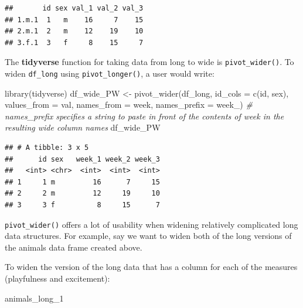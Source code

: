 \documentclass[
]{book}
\newenvironment{Shaded}{\begin{snugshade}}{\end{snugshade}}
\newcommand{\AttributeTok}[1]{\textcolor[rgb]{0.77,0.63,0.00}{#1}}
\newcommand{\CommentTok}[1]{\textcolor[rgb]{0.56,0.35,0.01}{\textit{#1}}}
\newcommand{\FunctionTok}[1]{\textcolor[rgb]{0.00,0.00,0.00}{#1}}
\newcommand{\NormalTok}[1]{#1}
\newcommand{\OtherTok}[1]{\textcolor[rgb]{0.56,0.35,0.01}{#1}}
\newcommand{\StringTok}[1]{\textcolor[rgb]{0.31,0.60,0.02}{#1}}
\begin{document}
\begin{verbatim}
##       id sex val_1 val_2 val_3
## 1.m.1  1   m    16     7    15
## 2.m.1  2   m    12    19    10
## 3.f.1  3   f     8    15     7
\end{verbatim}

The \textbf{tidyverse} function for taking data from long to wide is \texttt{pivot\_wider()}. To widen \texttt{df\_long} using \texttt{pivot\_longer()}, a user would write:

\begin{Shaded}
\begin{Highlighting}[]
\FunctionTok{library}\NormalTok{(tidyverse)}
\NormalTok{df\_wide\_PW }\OtherTok{\textless{}{-}} \FunctionTok{pivot\_wider}\NormalTok{(df\_long,}
                          \AttributeTok{id\_cols =} \FunctionTok{c}\NormalTok{(}\StringTok{\textquotesingle{}id\textquotesingle{}}\NormalTok{, }\StringTok{\textquotesingle{}sex\textquotesingle{}}\NormalTok{),}
                          \AttributeTok{values\_from =} \StringTok{\textquotesingle{}val\textquotesingle{}}\NormalTok{,}
                          \AttributeTok{names\_from =} \StringTok{\textquotesingle{}week\textquotesingle{}}\NormalTok{,}
                          \AttributeTok{names\_prefix =} \StringTok{\textquotesingle{}week\_\textquotesingle{}}\NormalTok{) }\CommentTok{\# \textasciigrave{}names\_prefix\textasciigrave{} specifies a string to paste in front of the contents of \textquotesingle{}week\textquotesingle{} in the resulting wide column names}
\NormalTok{df\_wide\_PW}
\end{Highlighting}
\end{Shaded}

\begin{verbatim}
## # A tibble: 3 x 5
##      id sex   week_1 week_2 week_3
##   <int> <chr>  <int>  <int>  <int>
## 1     1 m         16      7     15
## 2     2 m         12     19     10
## 3     3 f          8     15      7
\end{verbatim}

\texttt{pivot\_wider()} offers a lot of usability when widening relatively complicated long data structures. For example, say we want to widen both of the long versions of the animals data frame created above.

To widen the version of the long data that has a column for each of the measures (playfulness and excitement):

\begin{Shaded}
\begin{Highlighting}[]
\NormalTok{animals\_long\_1}
\end{Highlighting}
\end{Shaded}
\end{document}
